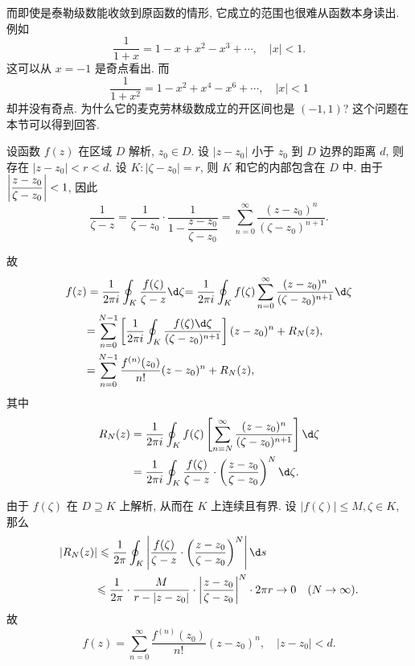 而即使是泰勒级数能收敛到原函数的情形, 它成立的范围也很难从函数本身读出.
例如
\[\dfrac1{1+x}=1-x+x^2-x^3+\cdots,\quad|x|<1.\]
这可以从 $x=-1$ 是奇点看出.
而
\[\dfrac1{1+x^2}=1-x^2+x^4-x^6+\cdots,\quad|x|<1\]
却并没有奇点.
为什么它的麦克劳林级数成立的开区间也是 $(-1,1)$?
这个问题在本节可以得到回答.

设函数 $f(z)$ 在区域 $D$ 解析, $z_0\in D$.
设 $|z-z_0|$ 小于 $z_0$ 到 $D$ 边界的距离 $d$,
则存在 $|z-z_0|<r<d$.
设 $K:|\zeta-z_0|=r$, 则 $K$ 和它的内部包含在 $D$ 中.
由于 $\left|\dfrac{z-z_0}{\zeta-z_0}\right|<1$, 因此
\[\frac1{\zeta-z}=\frac1{\zeta-z_0}\cdot\frac1{1-\dfrac{z-z_0}{\zeta-z_0}}=\sum_{n=0}^\infty\frac{(z-z_0)^n}{(\zeta-z_0)^{n+1}}.\]


\begin{center}
\end{center}

故
\begin{align*}
	f(z)&=\frac1{2\pi i}\oint_K \frac{f(\zeta)}{\zeta-z}\d\zeta
	{=\frac1{2\pi i}\oint_K f(\zeta)\sum_{n=0}^\infty\frac{(z-z_0)^n}{(\zeta-z_0)^{n+1}}\d\zeta}\\
	&{=
	\sum_{n=0}^{N-1}\left[\frac1{2\pi i}\oint_K\frac{f(\zeta)\d\zeta}{(\zeta-z_0)^{n+1}}\right](z-z_0)^n+R_N(z),}\\
	&{=
	\sum_{n=0}^{N-1}\frac{f^{(n)}(z_0)}{n!}(z-z_0)^n+R_N(z),}
\end{align*}
其中
\begin{align*}
	R_N(z)&=\frac1{2\pi i}\oint_Kf(\zeta)\left[\sum_{n=N}^\infty\frac{(z-z_0)^n}{(\zeta-z_0)^{n+1}}\right]\d\zeta\\
	&=\frac1{2\pi i}\oint_K\frac{f(\zeta)}{\zeta-z}\cdot\left(\frac{z-z_0}{\zeta-z_0}\right)^N\d\zeta.
\end{align*}

由于 $f(\zeta)$ 在 $D\supseteq K$ 上解析, 从而在 $K$ 上连续且有界.
设 $|f(\zeta)|\le M,\zeta\in K$,
那么
\begin{align*}
	|R_N(z)|&\le\frac 1{2\pi}\oint_K\abs{\frac{f(\zeta)}{\zeta-z}\cdot\left(\frac{z-z_0}{\zeta-z_0}\right)^N}\d s\\
	&{\le\frac 1{2\pi}\cdot \frac M{r-|z-z_0|}\cdot\abs{\frac{z-z_0}{\zeta-z_0}}^N\cdot 2\pi r\to 0\quad (N\to\infty).}
\end{align*}
故
\[f(z)=\sum_{n=0}^\infty\frac{f^{(n)}(z_0)}{n!}(z-z_0)^n,\quad |z-z_0|<d.\]

